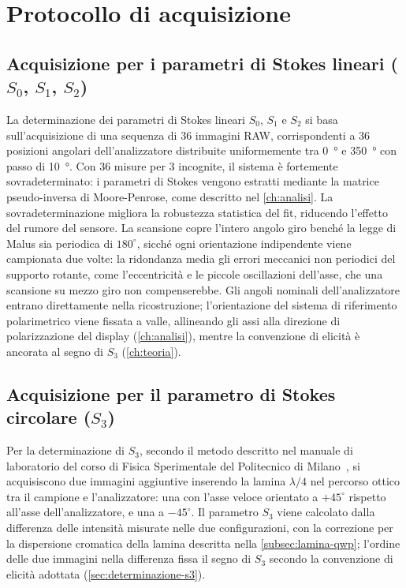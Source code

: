 \section{Protocollo di acquisizione}
\label{sec:protocollo}

\subsection{Acquisizione per i parametri di Stokes lineari (\texorpdfstring{$S_0$, $S_1$, $S_2$}{S0, S1, S2})}
\label{subsec:acquisizione-lineari}

La determinazione dei parametri di Stokes lineari $S_0$, $S_1$ e $S_2$ si basa sull'acquisizione di una sequenza di 36 immagini RAW, corrispondenti a 36 posizioni angolari dell'analizzatore distribuite uniformemente tra \SI{0}{\degree} e \SI{350}{\degree} con passo di \SI{10}{\degree}. Con 36 misure per 3 incognite, il sistema è fortemente sovradeterminato: i parametri di Stokes vengono estratti mediante la matrice pseudo-inversa di Moore-Penrose, come descritto nel \cref{ch:analisi}. La sovradeterminazione migliora la robustezza statistica del fit, riducendo l'effetto del rumore del sensore. La scansione copre l'intero angolo giro benché la legge di Malus sia periodica di $180^\circ$, sicché ogni orientazione indipendente viene campionata due volte: la ridondanza media gli errori meccanici non periodici del supporto rotante, come l'eccentricità e le piccole oscillazioni dell'asse, che una scansione su mezzo giro non compenserebbe. Gli angoli nominali dell'analizzatore entrano direttamente nella ricostruzione; l'orientazione del sistema di riferimento polarimetrico viene fissata a valle, allineando gli assi alla direzione di polarizzazione del display (\cref{ch:analisi}), mentre la convenzione di elicità è ancorata al segno di $S_3$ (\cref{ch:teoria}).

\subsection{Acquisizione per il parametro di Stokes circolare (\texorpdfstring{$S_3$}{S3})}
\label{subsec:acquisizione-s3}
Per la determinazione di $S_3$, secondo il metodo descritto nel manuale di laboratorio del corso di Fisica Sperimentale del Politecnico di Milano~\cite{manuale_polarizzazione}, si acquisiscono due immagini aggiuntive inserendo la lamina $\lambda/4$ nel percorso ottico tra il campione e l'analizzatore: una con l'asse veloce orientato a $+45^\circ$ rispetto all'asse dell'analizzatore, e una a $-45^\circ$. Il parametro $S_3$ viene calcolato dalla differenza delle intensità misurate nelle due configurazioni, con la correzione per la dispersione cromatica della lamina descritta nella \cref{subsec:lamina-qwp}; l'ordine delle due immagini nella differenza fissa il segno di $S_3$ secondo la convenzione di elicità adottata (\cref{sec:determinazione-s3}).

